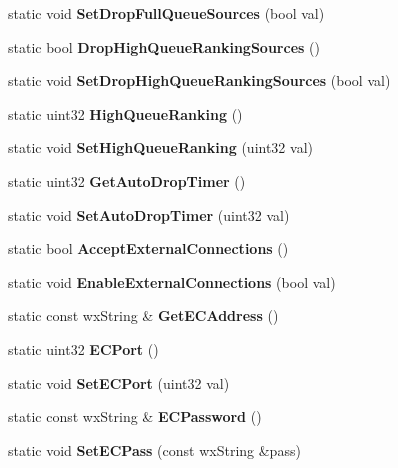 \begin{DoxyCompactItemize}
\item 
static void {\bfseries SetDropFullQueueSources} (bool val)\label{classCPreferences_ad0e8915c52a172efe06e6ba37a75e6aa}

\item 
static bool {\bfseries DropHighQueueRankingSources} ()\label{classCPreferences_a1bd7b4dd69a12fb95eef94516f530091}

\item 
static void {\bfseries SetDropHighQueueRankingSources} (bool val)\label{classCPreferences_aab9f1543d039156f76cce60343a5b153}

\item 
static uint32 {\bfseries HighQueueRanking} ()\label{classCPreferences_a99d12efdaba96885683b9a0570745d85}

\item 
static void {\bfseries SetHighQueueRanking} (uint32 val)\label{classCPreferences_a378fa8e60afa25407a6b15965642644f}

\item 
static uint32 {\bfseries GetAutoDropTimer} ()\label{classCPreferences_aebe65fe35b7e300464f2554519afc303}

\item 
static void {\bfseries SetAutoDropTimer} (uint32 val)\label{classCPreferences_a95792f2c4a057bbebefa5ec50258a076}

\item 
static bool {\bfseries AcceptExternalConnections} ()\label{classCPreferences_a98b515cd8d37dacf59fef8e91bb914b0}

\item 
static void {\bfseries EnableExternalConnections} (bool val)\label{classCPreferences_a52f9f236cb97c57bbefab7de330978b3}

\item 
static const wxString \& {\bfseries GetECAddress} ()\label{classCPreferences_acdf4d54a57ab00f855a529fd88a5078b}

\item 
static uint32 {\bfseries ECPort} ()\label{classCPreferences_ab476e374486ff69a3d0e119830de7a6f}

\item 
static void {\bfseries SetECPort} (uint32 val)\label{classCPreferences_a55bda89631db08064490c5cb8b82dd69}

\item 
static const wxString \& {\bfseries ECPassword} ()\label{classCPreferences_aa26ae3f6b1d12764687908e5dce924d4}

\item 
static void {\bfseries SetECPass} (const wxString \&pass)\label{classCPreferences_a83e87339fd1324e4867a03ef93f3fd95}


\end{DoxyCompactItemize}
